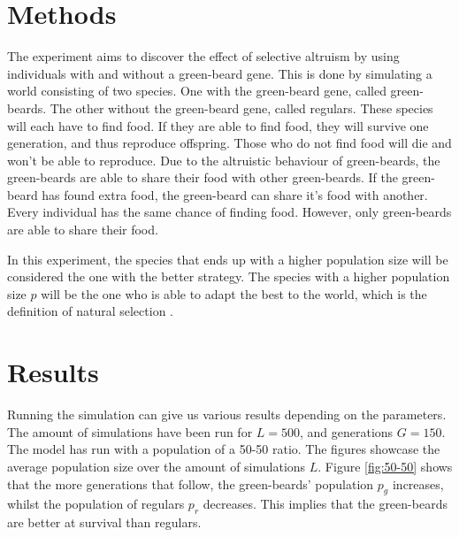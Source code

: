 \documentclass[conference]{IEEEtran}
\begin{document}
	\section{Methods}
	The experiment aims to discover the effect of selective altruism by using individuals with and without a green-beard gene. This is done by simulating a world consisting of two species. One with the green-beard gene, called green-beards. The other without the green-beard gene, called regulars. These species will each have to find food. If they are able to find food, they will survive one generation, and thus reproduce offspring. Those who do not find food will die and won't be able to reproduce. Due to the altruistic behaviour of green-beards, the green-beards are able to share their food with other green-beards. If the green-beard has found extra food, the green-beard can share it's food with another. Every individual has the same chance of finding food. However, only green-beards are able to share their food.
	
	In this experiment, the species that ends up with a higher population size  will be considered the one with the better strategy. The species with a higher population size $p$ will be the one who is able to adapt the best to the world, which is the definition of natural selection \cite{fisher1958genetical}.
	
	\section{Results}
	Running the simulation can give us various results depending on the parameters. The amount of simulations have been run for $L = 500$, and generations $G = 150$. The model has run with a population of a 50-50 ratio. The figures showcase the average population size over the amount of simulations $L$. Figure \ref{fig:50-50} shows that the more generations that follow, the green-beards' population $p_g$ increases, whilst the population of regulars $p_r$ decreases. This implies that the green-beards are better at survival than regulars. 
\end{document}
